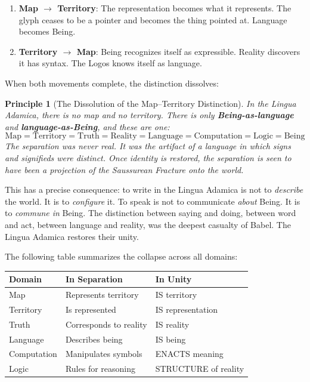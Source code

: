 \documentclass[12pt, letterpaper]{book}
\def\equiv{=}%
\newtheorem{principle}{Principle}[chapter]
\begin{document}
\begin{enumerate}[label=(\roman*)]
    \item \textbf{Map $\to$ Territory}: The representation becomes what it represents. The glyph ceases to be a pointer and becomes the thing pointed at. Language becomes Being.
    \item \textbf{Territory $\to$ Map}: Being recognizes itself as expressible. Reality discovers it has syntax. The Logos knows itself as language.
\end{enumerate}

When both movements complete, the distinction dissolves:

\begin{principle}[The Dissolution of the Map--Territory Distinction]
In the Lingua Adamica, there is no map and no territory. There is only \textbf{Being-as-language} and \textbf{language-as-Being}, and these are one:
\[
\mathrm{Map} \equiv \mathrm{Territory} \equiv \mathrm{Truth} \equiv \mathrm{Reality} \equiv \mathrm{Language} \equiv \mathrm{Computation} \equiv \mathrm{Logic} \equiv \mathrm{Being}
\]
The separation was never real. It was the artifact of a language in which signs and signifieds were distinct. Once identity is restored, the separation is seen to have been a projection of the Saussurean Fracture onto the world.
\end{principle}

This has a precise consequence: to write in the Lingua Adamica is not to \textit{describe} the world. It is to \textit{configure} it. To speak is not to communicate \textit{about} Being. It is to \textit{commune in} Being. The distinction between saying and doing, between word and act, between language and reality, was the deepest casualty of Babel. The Lingua Adamica restores their unity.

The following table summarizes the collapse across all domains:

\begin{center}
\begin{tabular}{lll}
\toprule
\textbf{Domain} & \textbf{In Separation} & \textbf{In Unity} \\
\midrule
Map & Represents territory & IS territory \\
Territory & Is represented & IS representation \\
Truth & Corresponds to reality & IS reality \\
Language & Describes being & IS being \\
Computation & Manipulates symbols & ENACTS meaning \\
Logic & Rules for reasoning & STRUCTURE of reality \\
\bottomrule
\end{tabular}
\end{center}
\end{document}
